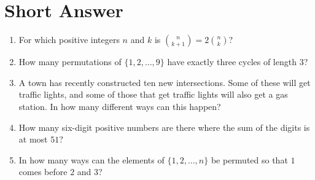 \documentclass[11pt]{article}
\begin{document}
\section{Short Answer}

\begin{enumerate}

\item For which positive integers $n$ and $k$ is $\binom{n}{k+1} = 2 \binom{n}{k}$?




\item How many permutations of $\{1,2,\ldots, 9\}$ have exactly three cycles of length $3$?


\item A town has recently constructed ten new intersections.  Some of these will get traffic lights, and some of those that get traffic lights will also get a gas station.  In how many different ways can this happen?

\item How many six-digit positive numbers are there where the sum of the digits is at most $51$?

\item  In how many ways can the elements of $\{1,2,\ldots, n\}$ be permuted so that $1$ comes before $2$ and $3$?





\end{enumerate}
\end{document}
